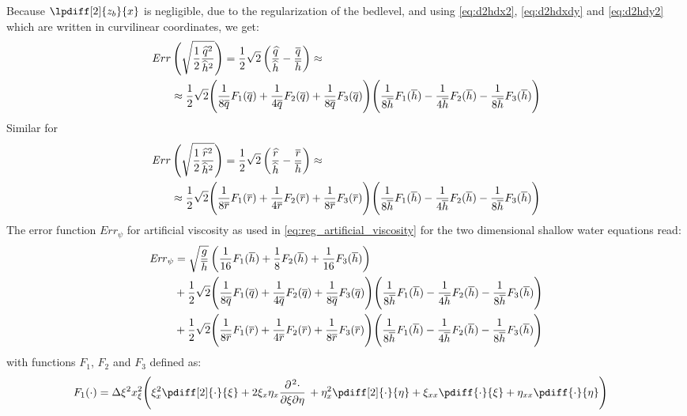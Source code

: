 Because $\lpdiff[2]{z_b}{x}$ is negligible, due to the regularization of the bedlevel, and using \autoref{eq:d2hdx2}, \eqref{eq:d2hdxdy} and \eqref{eq:d2hdy2} which are  written in curvilinear coordinates, we get:
%
\begin{align}
    {\mathit Err}&\left( \sqrt{\frac{1}{2} \frac{\widehat{q}^2}{\widehat{h}^2}} \right) =
    \frac{1}{2} \sqrt{2} \left( \frac{\widehat{q}}{\widehat{h}}
    - \frac{\overline{q}}{\overline{h}} \right) \approx
    \\*
    &\approx \frac{1}{2}\sqrt{2}\Bigg(
    \frac{1}{8\overline{q}} F_1(\overline{q}) + \frac{1}{4\overline{q}} F_2(\overline{q}) + \frac{1}{8\overline{q}} F_3(\overline{q})
    \Bigg)
    \Bigg(
    \frac{1}{8\overline{h}} F_1(\overline{h}) - \frac{1}{4\overline{h}} F_2(\overline{h}) - \frac{1}{8\overline{h}} F_3(\overline{h})
    \Bigg)
\end{align}
Similar for
\begin{align}
    {\mathit Err}&\left( \sqrt{\frac{1}{2} \frac{\widehat{r}^2}{\widehat{h}^2}} \right) =
    \frac{1}{2} \sqrt{2} \left( \frac{\widehat{r}}{\widehat{h}}
    - \frac{\overline{r}}{\overline{h}} \right) \approx
    \\*
    &\approx \frac{1}{2}\sqrt{2}\Bigg(
    \frac{1}{8\overline{r}} F_1(\overline{r}) + \frac{1}{4\overline{r}} F_2(\overline{r}) + \frac{1}{8\overline{r}} F_3(\overline{r})
    \Bigg)
    \Bigg(
    \frac{1}{8\overline{h}} F_1(\overline{h}) - \frac{1}{4\overline{h}} F_2(\overline{h}) - \frac{1}{8\overline{h}} F_3(\overline{h})
    \Bigg)
\end{align}
The error function $\mathit{Err}_{\psi}$ for artificial viscosity as used in \autoref{eq:reg_artificial_viscosity}    for the two dimensional shallow water equations read:
\begin{align}
\mathit{Err}_{\psi}& =
%
%
\sqrt{\frac{g}{\hbar}} \left(  \frac{1}{16} F_1(\hbar) +  \frac{1}{8} F_2(\hbar) + \frac{1}{16} F_3(\hbar) \right)
\\*
%
%
& + \half\sqrt{2}\Bigg(
\frac{1}{8\qbar} F_1(\qbar) + \frac{1}{4\qbar} F_2(\qbar) + \frac{1}{8\qbar} F_3(\qbar)
\Bigg)
\Bigg(
\frac{1}{8\hbar} F_1(\hbar) - \frac{1}{4\hbar} F_2(\hbar) - \frac{1}{8\hbar} F_3(\hbar)
\Bigg)
\\*
%
%
& + \half\sqrt{2}\Bigg(
\frac{1}{8\rbar} F_1(\rbar) + \frac{1}{4\rbar} F_2(\rbar) + \frac{1}{8\rbar} F_3(\rbar)
\Bigg)
\Bigg(
\frac{1}{8\hbar} F_1(\hbar) - \frac{1}{4\hbar} F_2(\hbar) - \frac{1}{8\hbar} F_3(\hbar)
\Bigg)
\end{align}
with functions $F_1$, $F_2$ and $F_3$ defined as:
\begin{align}
    F_1(\cdot) & =
    \Dxi^2 x_\xi^2\Bigg(\xi_x^2 \pdiff[2]{\cdot}{\xi}
    + 2 \xi_x \eta_x \frac{\partial\kern 0.083333em^2 \cdot}{\partial \xi \partial \eta}\,
    + \eta_x^2 \pdiff[2]{\cdot}{\eta}
    + \xi_{xx} \pdiff{\cdot}{\xi}
    + \eta_{xx} \pdiff{\cdot}{\eta}
    \Bigg)
\end{align}
